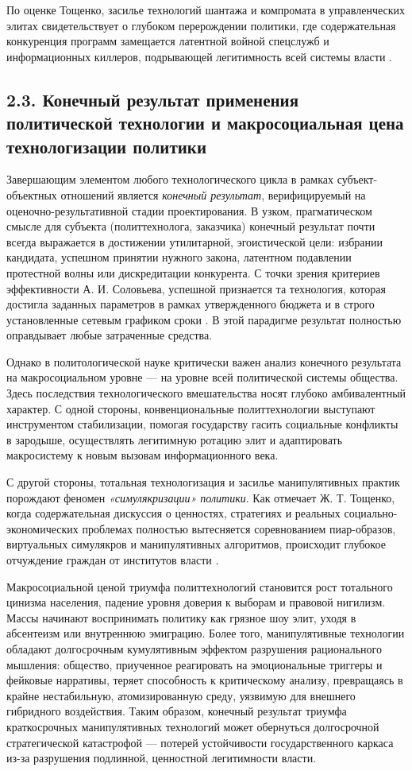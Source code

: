 По оценке Тощенко, засилье технологий шантажа и компромата в управленческих элитах свидетельствует о глубоком перерождении политики, где содержательная конкуренция программ замещается латентной войной спецслужб и информационных киллеров, подрывающей легитимность всей системы власти \cite{Toschenko}.

\subsection{2.3. Конечный результат применения политической технологии и макросоциальная цена технологизации политики}

Завершающим элементом любого технологического цикла в рамках субъект-объектных отношений является \textit{конечный результат}, верифицируемый на оценочно-результативной стадии проектирования. В узком, прагматическом смысле для субъекта (политтехнолога, заказчика) конечный результат почти всегда выражается в достижении утилитарной, эгоистической цели: избрании кандидата, успешном принятии нужного закона, латентном подавлении протестной волны или дискредитации конкурента. С точки зрения критериев эффективности А. И. Соловьева, успешной признается та технология, которая достигла заданных параметров в рамках утвержденного бюджета и в строго установленные сетевым графиком сроки \cite{Solovyev}. В этой парадигме результат полностью оправдывает любые затраченные средства.

Однако в политологической науке критически важен анализ конечного результата на макросоциальном уровне — на уровне всей политической системы общества. Здесь последствия технологического вмешательства носят глубоко амбивалентный характер. С одной стороны, конвенциональные политтехнологии выступают инструментом стабилизации, помогая государству гасить социальные конфликты в зародыше, осуществлять легитимную ротацию элит и адаптировать макросистему к новым вызовам информационного века. 

С другой стороны, тотальная технологизация и засилье манипулятивных практик порождают феномен \textit{«симулякризации» политики}. Как отмечает Ж. Т. Тощенко, когда содержательная дискуссия о ценностях, стратегиях и реальных социально-экономических проблемах полностью вытесняется соревнованием пиар-образов, виртуальных симулякров и манипулятивных алгоритмов, происходит глубокое отчуждение граждан от институтов власти \cite{Toschenko}.

Макросоциальной ценой триумфа политтехнологий становится рост тотального цинизма населения, падение уровня доверия к выборам и правовой нигилизм. Массы начинают воспринимать политику как грязное шоу элит, уходя в абсентеизм или внутреннюю эмиграцию. Более того, манипулятивные технологии обладают долгосрочным кумулятивным эффектом разрушения рационального мышления: общество, приученное реагировать на эмоциональные триггеры и фейковые нарративы, теряет способность к критическому анализу, превращаясь в крайне нестабильную, атомизированную среду, уязвимую для внешнего гибридного воздействия. Таким образом, конечный результат триумфа краткосрочных манипулятивных технологий может обернуться долгосрочной стратегической катастрофой — потерей устойчивости государственного каркаса из-за разрушения подлинной, ценностной легитимности власти.